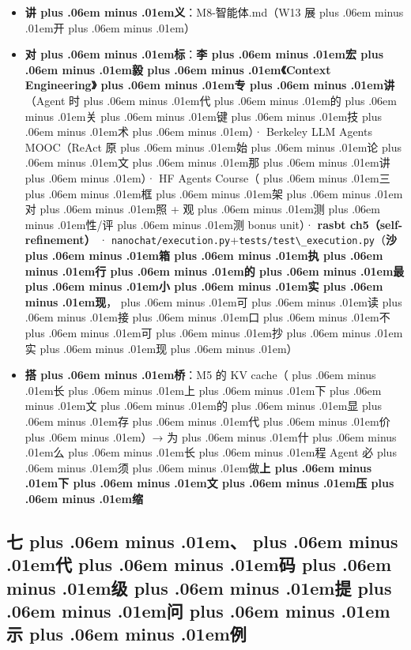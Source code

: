 \documentclass[
]{article}
\newcommand{\passthrough}[1]{#1}
\providecommand{\tightlist}{%
  \setlength{\itemsep}{0pt}\setlength{\parskip}{0pt}}
\def\zh#1{{\zhfont #1}}
\def\sym#1{{\symfont #1}}
\def\codezh#1{{\zhmonofont #1}}
\def\zhglue{\hskip0pt plus .06em minus .01em}
\begin{document}
\begin{itemize}
\tightlist
\item
  \textbf{\zh{讲\zhglue 义}}\zh{：}\passthrough{\codezh{M8-{\zh{智}}{\zh{能}}{\zh{体}}.md}}\zh{（}W13 \zh{展\zhglue 开\zhglue ）}
\item
  \textbf{\zh{对\zhglue 标}}\zh{：}\textbf{\zh{李\zhglue 宏\zhglue 毅\zhglue 《}Context Engineering\zh{》\zhglue 专\zhglue 讲}}\zh{（}Agent \zh{时\zhglue 代\zhglue 的\zhglue 关\zhglue 键\zhglue 技\zhglue 术\zhglue ）}\sym{·} Berkeley LLM Agents MOOC\zh{（}ReAct \zh{原\zhglue 始\zhglue 论\zhglue 文\zhglue 那\zhglue 讲\zhglue ）}\sym{·} HF Agents Course\zh{（\zhglue 三\zhglue 框\zhglue 架\zhglue 对\zhglue 照} + \zh{观\zhglue 测\zhglue 性}/\zh{评\zhglue 测} bonus unit\zh{）}\sym{·} \textbf{rasbt ch5\zh{（}self-refinement\zh{）}} \sym{·} \passthrough{\lstinline!nanochat/execution.py!}+\passthrough{\lstinline!tests/test\_execution.py!}\zh{（}\textbf{\zh{沙\zhglue 箱\zhglue 执\zhglue 行\zhglue 的\zhglue 最\zhglue 小\zhglue 实\zhglue 现}}\zh{，\zhglue 可\zhglue 读\zhglue 接\zhglue 口\zhglue 不\zhglue 可\zhglue 抄\zhglue 实\zhglue 现\zhglue ）}
\item
  \textbf{\zh{搭\zhglue 桥}}\zh{：}M5 \zh{的} KV cache\zh{（\zhglue 长\zhglue 上\zhglue 下\zhglue 文\zhglue 的\zhglue 显\zhglue 存\zhglue 代\zhglue 价\zhglue ）}\sym{→} \zh{为\zhglue 什\zhglue 么\zhglue 长\zhglue 程} Agent \zh{必\zhglue 须\zhglue 做}\textbf{\zh{上\zhglue 下\zhglue 文\zhglue 压\zhglue 缩}}
\end{itemize}

\subsection{\zh{七\zhglue 、\zhglue 代\zhglue 码\zhglue 级\zhglue 提\zhglue 问\zhglue 示\zhglue 例}}\label{ux4e03ux4ee3ux7801ux7ea7ux63d0ux95eeux793aux4f8b-7}
\end{document}

